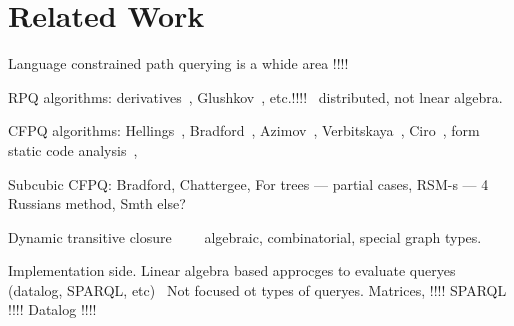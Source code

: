 \section{Related Work}

Language constrained path querying is a whide area !!!!

RPQ algorithms: derivatives~\cite{!!!}, Glushkov~\cite{!!!}, etc.!!!!~\cite{!!!} distributed, not lnear algebra.

CFPQ algorithms: Hellings~\cite{!!!}, Bradford~\cite{8249039}, Azimov~\cite{!!!}, Verbitskaya~\cite{!!!}, Ciro~\cite{!!!}, form static code analysis~\cite{!!!}, 

Subcubic CFPQ: Bradford, Chattergee, For trees --- partial cases, RSM-s --- 4 Russians method, Smth else? 

Dynamic transitive closure~\cite{!!!}~\cite{!!!}~\cite{!!!}~\cite{!!!} algebraic, combinatorial, special graph types.

Implementation side. 
Linear algebra based approcges to evaluate queryes (datalog, SPARQL, etc)~\cite{!!!} Not focused ot types of queryes.
Matrices, !!!!
SPARQL !!!!
Datalog !!!!